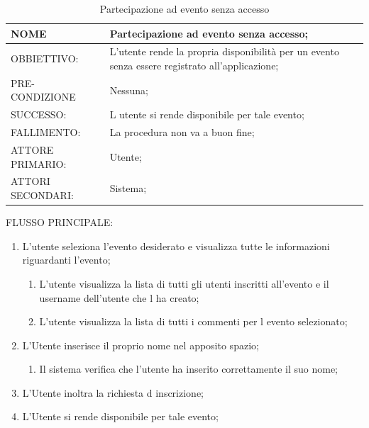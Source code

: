 \begin{table}[H]
\begin{tabular}{p{}|p{}}
\toprule
NOME & Partecipazione ad evento senza accesso;\\
\hline
OBBIETTIVO: & L'utente rende la propria disponibilità per un evento senza essere registrato all'applicazione;\\
\hline
PRE-CONDIZIONE & Nessuna;\\
\hline
SUCCESSO: & L utente si rende disponibile per tale evento;\\
	\hline
FALLIMENTO: & La procedura non va a buon fine;\\
\hline
ATTORE PRIMARIO: & Utente;\\
\hline
ATTORI SECONDARI: & Sistema;\\
\bottomrule
\end{tabular}
\caption{Partecipazione ad evento senza accesso}
\label{table:parSA}
\end{table}
FLUSSO PRINCIPALE:
\begin{enumerate}
\item L'utente seleziona l'evento desiderato e visualizza tutte le informazioni riguardanti l'evento;
\begin{enumerate}
\item L'utente visualizza la lista di tutti gli utenti inscritti all'evento e il username dell'utente che l ha creato;
\item L'utente visualizza la lista di tutti i commenti per l evento selezionato;
\end{enumerate}
\item L'Utente inserisce il proprio nome nel apposito spazio;
\begin{enumerate}
\item Il sistema verifica che l'utente ha inserito correttamente il suo nome;
\end{enumerate}
\item L'Utente inoltra la richiesta d inscrizione;
\item L'Utente si rende disponibile per tale evento;
\end{enumerate}

